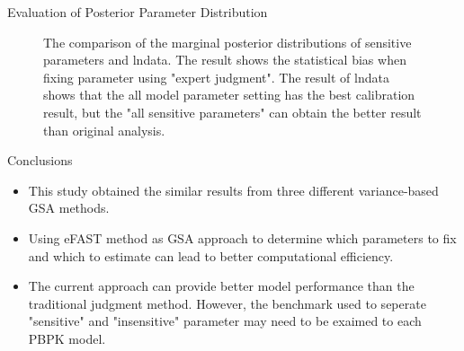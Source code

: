 \documentclass[xcolor=table]{beamer}
\begin{document}
\begin{frame}[t]
\begin{columns}[t]
\begin{column}{0.23\paperwidth}
\begin{block}{Evaluation of Posterior Parameter Distribution}
\begin{figure}
\caption{The comparison of the marginal posterior distributions of sensitive parameters and lndata. 
The result shows the statistical bias when fixing parameter using "expert judgment".
The result of lndata shows that the all model parameter setting has the best calibration result, but the "all sensitive parameters" can obtain the better result than original analysis.
}

\end{figure}
\end{block}
\begin{alertblock}{Conclusions}
\begin{itemize}
\item This study obtained the similar results from three different variance-based GSA methods.
\item Using eFAST method as GSA approach to determine which parameters to fix and which to estimate can lead to better computational efficiency.
\item The current approach can provide better model performance than the traditional judgment method.
However, the benchmark used to seperate "sensitive" and "insensitive" parameter may need to be exaimed to each PBPK model.
\end{itemize}
\end{alertblock}
%
%
\end{column} %


\end{columns}
\end{frame}
\end{document}
